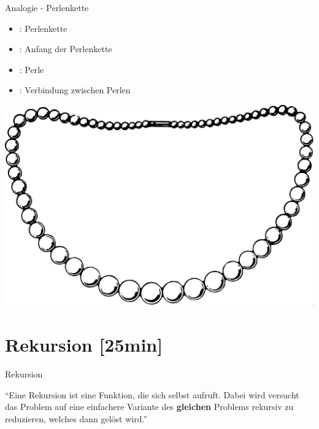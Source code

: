 \documentclass{../tuda-beamer}
\begin{document}
    \begin{frame}[c]{Analogie - Perlenkette}
        \begin{minipage}{.475\textwidth}
            \begin{itemize}
                \item {}: Perlenkette
                \item {}: Anfang der Perlenkette
                \item {}: Perle
                \item {}: Verbindung zwischen Perlen
            \end{itemize}
        \end{minipage}
        \hfill
        \begin{minipage}{.475\textwidth}
            \centering
            \includegraphics[width=.8\textwidth]{graphics/pearls}
            \label{fig:pearls}
        \end{minipage}
    \end{frame}


    \section{Rekursion [25min]}
    \label{sec:recursion}
    \begin{frame}[c]{Rekursion}
        \begin{center}
            \enquote{Eine Rekursion ist eine Funktion, die sich selbst aufruft. Dabei wird versucht
            das Problem auf eine einfachere Variante des \textbf{gleichen} Problems rekursiv zu
            reduzieren, welches dann gelöst wird.}
        \end{center}
    \end{frame}
\end{document}
